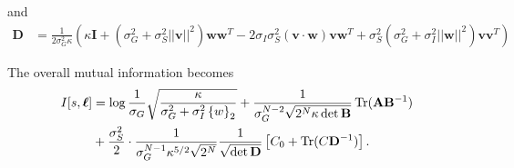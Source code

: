 \documentclass[11pt]{article}
\DeclareMathOperator{\Tr}{Tr}
\begin{document}
and 
\begin{align}
	\mathbf{D} &= \frac{1}{2 \sigma_G^2 \kappa} \left(\kappa \mathbf{I}+ (\sigma_G^2 + \sigma_S^2 ||\mathbf{v}||^2 ) \mathbf{w}\mathbf{w}^T - 2 \sigma_I \sigma_S^2 (\mathbf{v}\cdot\mathbf{w})\mathbf{v}\mathbf{w}^T  +\sigma_S^2 (\sigma_G^2 + \sigma_I^2 ||\mathbf{w}||^2)\mathbf{v}\mathbf{v}^T\right)
\end{align}

The overall mutual information becomes 
\begin{align}
	I[s,\boldsymbol{\ell}] &=  \log \frac{1}{\sigma_G}\sqrt{\frac{\kappa}{\sigma_G^2 +\sigma_I^2 \left\{w\right\}_2}} + \frac{1}{\sigma_G^{N-2}\sqrt{2^N \kappa \det \mathbf{B}}} \Tr (\mathbf{A} \mathbf{B}^{-1}) \notag \\
	&+ \frac{\sigma_S^2}{2}\cdot \frac{1}{\sigma_G^{N-1}\kappa^{5/2}\sqrt{2^N}} \frac{1}{\sqrt{\det \mathbf{D}}}\left[C_0 + \Tr(C\mathbf{D}^{-1})\right].
\end{align}
\end{document}
